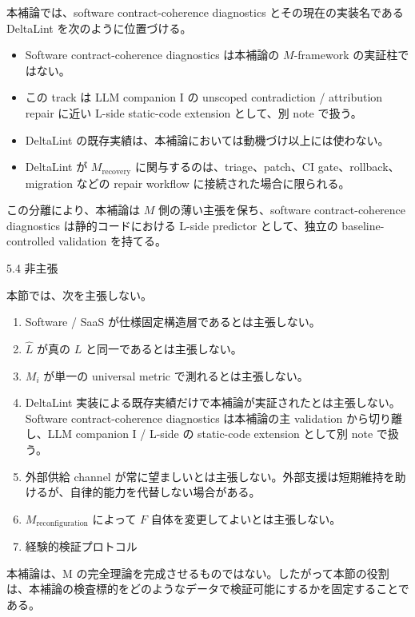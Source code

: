\documentclass[12pt,a4paper]{article}
\begin{document}
本補論では、software contract-coherence diagnostics とその現在の実装名である DeltaLint を次のように位置づける。

\begin{itemize}
\tightlist
\item
  Software contract-coherence diagnostics は本補論の \(M\)-framework の実証柱ではない。
\item
  この track は LLM companion I の unscoped contradiction / attribution repair に近い L-side static-code extension として、別 note で扱う。
\item
  DeltaLint の既存実績は、本補論においては動機づけ以上には使わない。
\item
  DeltaLint が \(M_{\mathrm{recovery}}\) に関与するのは、triage、patch、CI gate、rollback、migration などの repair workflow に接続された場合に限られる。
\end{itemize}

この分離により、本補論は \(M\) 側の薄い主張を保ち、software contract-coherence diagnostics は静的コードにおける L-side predictor として、独立の baseline-controlled validation を持てる。

5.4 非主張

本節では、次を主張しない。

\begin{enumerate}
\def\labelenumi{\arabic{enumi}.}
\item
  Software / SaaS が仕様固定構造層であるとは主張しない。
\item
  \(\hat L\) が真の \(L\) と同一であるとは主張しない。
\item
  \(M_i\) が単一の universal metric で測れるとは主張しない。
\item
  DeltaLint 実装による既存実績だけで本補論が実証されたとは主張しない。Software contract-coherence diagnostics は本補論の主 validation から切り離し、LLM companion I / L-side の static-code extension として別 note で扱う。
\item
  外部供給 channel が常に望ましいとは主張しない。外部支援は短期維持を助けるが、自律的能力を代替しない場合がある。
\item
  \(M_{\mathrm{reconfiguration}}\) によって \(F\) 自体を変更してよいとは主張しない。
\item
  経験的検証プロトコル
\end{enumerate}

本補論は、M の完全理論を完成させるものではない。したがって本節の役割は、本補論の検査標的をどのようなデータで検証可能にするかを固定することである。
\end{document}
